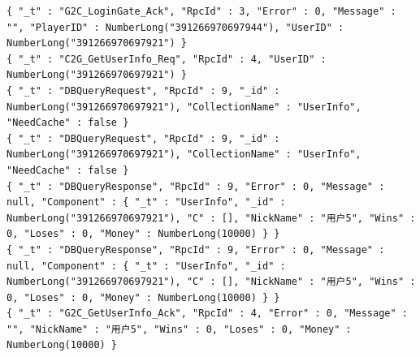 \documentclass[9pt, b5paper]{article}
\begin{document}
\begin{verbatim}
{ "_t" : "G2C_LoginGate_Ack", "RpcId" : 3, "Error" : 0, "Message" : "", "PlayerID" : NumberLong("391266970697944"), "UserID" : NumberLong("391266970697921") }
{ "_t" : "C2G_GetUserInfo_Req", "RpcId" : 4, "UserID" : NumberLong("391266970697921") }
{ "_t" : "DBQueryRequest", "RpcId" : 9, "_id" : NumberLong("391266970697921"), "CollectionName" : "UserInfo", "NeedCache" : false }
{ "_t" : "DBQueryRequest", "RpcId" : 9, "_id" : NumberLong("391266970697921"), "CollectionName" : "UserInfo", "NeedCache" : false }
{ "_t" : "DBQueryResponse", "RpcId" : 9, "Error" : 0, "Message" : null, "Component" : { "_t" : "UserInfo", "_id" : NumberLong("391266970697921"), "C" : [], "NickName" : "用户5", "Wins" : 0, "Loses" : 0, "Money" : NumberLong(10000) } }
{ "_t" : "DBQueryResponse", "RpcId" : 9, "Error" : 0, "Message" : null, "Component" : { "_t" : "UserInfo", "_id" : NumberLong("391266970697921"), "C" : [], "NickName" : "用户5", "Wins" : 0, "Loses" : 0, "Money" : NumberLong(10000) } }
{ "_t" : "G2C_GetUserInfo_Ack", "RpcId" : 4, "Error" : 0, "Message" : "", "NickName" : "用户5", "Wins" : 0, "Loses" : 0, "Money" : NumberLong(10000) }
\end{verbatim}
\end{document}
